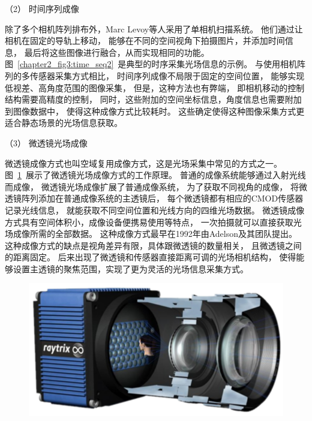 （2）
时间序列成像


除了多个相机阵列排布外，Marc Levoy等人采用了单相机扫描系统。
他们通过让相机在固定的导轨上移动，
能够在不同的空间视角下拍摄图片，并添加时间信息，
最后将这些图像进行融合，从而实现相同的功能。
图~\ref{chapter2_fig3:time_seq2}~是典型的时序采集光场信息的示例。
与使用相机阵列的多传感器采集方式相比，
时间序列成像不局限于固定的空间位置，
能够实现低视差、高角度范围的图像采集，
但是，这种方法也有弊端，
即相机移动的控制结构需要高精度的控制，
同时，这些附加的空间坐标信息，角度信息也需要附加到图像数据中，
使得这种成像方式比较耗时。
这些确定使得这种图像采集方式更适合静态场景的光场信息获取。












（3）
微透镜光场成像


微透镜成像方式也叫空域复用成像方式，这是光场采集中常见的方式之一。
图~\ref{chapter2_fig4:microlens_for_lf_imaging}~展示了微透镜光场成像方式的工作原理。
普通的成像系统能够通过入射光线而成像，
微透镜光场成像扩展了普通成像系统，
为了获取不同视角的成像，
将微透镜阵列添加在普通成像系统的主透镜后，
每个微透镜都有相应的CMOD传感器记录光线信息，
就能获取不同空间位置和光线方向的四维光场数据。
微透镜成像方式具有空间体积小，成像设备便携易使用等特点，
一次拍摄就可以直接获取光场成像所需的全部数据。
这种成像方式最早在1992年由Adelson及其团队提出。
这种成像方式的缺点是视角差异有限，具体跟微透镜的数量相关，
且微透镜之间的距离固定。
后来出现了微透镜和传感器直接距离可调的光场相机结构，
使得能够设置主透镜的聚焦范围，实现了更为灵活的光场信息采集方式。




\begin{figure}[t]
	\centering
	\includegraphics[width=0.65\linewidth]{figures/chapter2/microlens_for_lf_imaging2.drawio}
	\label{chapter2_fig4:microlens_for_lf_imaging}
\end{figure}






